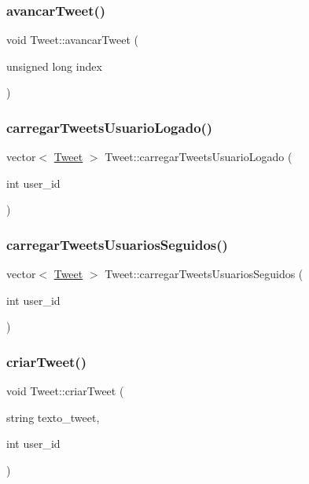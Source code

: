 \subsubsection{\texorpdfstring{avancar\+Tweet()}{avancarTweet()}}
{\footnotesize\ttfamily void Tweet\+::avancar\+Tweet (\begin{DoxyParamCaption}\item[{unsigned long}]{index }\end{DoxyParamCaption})}

\mbox{\label{class_tweet_a258770cc789790c85903f2ed3a468e8a}} 
\subsubsection{\texorpdfstring{carregar\+Tweets\+Usuario\+Logado()}{carregarTweetsUsuarioLogado()}}
{\footnotesize\ttfamily vector$<$ \hyperlink{class_tweet}{Tweet} $>$ Tweet\+::carregar\+Tweets\+Usuario\+Logado (\begin{DoxyParamCaption}\item[{int}]{user\+\_\+id }\end{DoxyParamCaption})}

\mbox{\label{class_tweet_a2e9a48b91eb50b1f69666dec18bedf07}} 
\subsubsection{\texorpdfstring{carregar\+Tweets\+Usuarios\+Seguidos()}{carregarTweetsUsuariosSeguidos()}}
{\footnotesize\ttfamily vector$<$ \hyperlink{class_tweet}{Tweet} $>$ Tweet\+::carregar\+Tweets\+Usuarios\+Seguidos (\begin{DoxyParamCaption}\item[{int}]{user\+\_\+id }\end{DoxyParamCaption})}

\mbox{\label{class_tweet_a597b72b7ece65d9a1a77d4f9de83477a}} 
\subsubsection{\texorpdfstring{criar\+Tweet()}{criarTweet()}}
{\footnotesize\ttfamily void Tweet\+::criar\+Tweet (\begin{DoxyParamCaption}\item[{string}]{texto\+\_\+tweet,  }\item[{int}]{user\+\_\+id }\end{DoxyParamCaption})}

